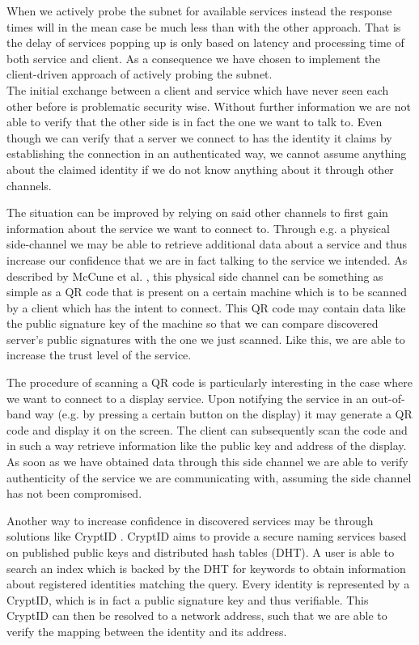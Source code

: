 When we actively probe the subnet for available services instead the response times will in the mean case be much less than with the other approach.
That is the delay of services popping up is only based on latency and processing time of both service and client.
As a consequence we have chosen to implement the client-driven approach of actively probing the subnet.\\


The initial exchange between a client and service which have never seen each other before is problematic security wise.
Without further information we are not able to verify that the other side is in fact the one we want to talk to.
Even though we can verify that a server we connect to has the identity it claims by establishing the connection in an authenticated way, we cannot assume anything about the claimed identity if we do not know anything about it through other channels.

The situation can be improved by relying on said other channels to first gain information about the service we want to connect to.
Through e.g. a physical side-channel we may be able to retrieve additional data about a service and thus increase our confidence that we are in fact talking to the service we intended.
As described by McCune et al. \cite{mccune2005seeing}, this physical side channel can be something as simple as a QR code that is present on a certain machine which is to be scanned by a client which has the intent to connect.
This QR code may contain data like the public signature key of the machine so that we can compare discovered server's public signatures with the one we just scanned.
Like this, we are able to increase the trust level of the service.

The procedure of scanning a QR code is particularly interesting in the case where we want to connect to a display service.
Upon notifying the service in an out-of-band way (e.g. by pressing a certain button on the display) it may generate a QR code and display it on the screen.
The client can subsequently scan the code and in such a way retrieve information like the public key and address of the display.
As soon as we have obtained data through this side channel we are able to verify authenticity of the service we are communicating with, assuming the side channel has not been compromised.

Another way to increase confidence in discovered services may be through solutions like CryptID \cite{malchow2015cryptid}.
CryptID aims to provide a secure naming services based on published public keys and distributed hash tables (DHT).
A user is able to search an index which is backed by the DHT for keywords to obtain information about registered identities matching the query.
Every identity is represented by a CryptID, which is in fact a public signature key and thus verifiable.
This CryptID can then be resolved to a network address, such that we are able to verify the mapping between the identity and its address.\\

